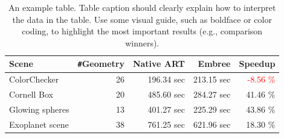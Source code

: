 \begin{table}
	\centering
	{\footnotesize\sf
		\begin{tabular}{lrrrr}
			\toprule
			Scene & \Verb!#!Geometry & Native ART & Embree & Speedup \\ 
			\midrule
			ColorChecker & 26 & 196.34 sec & 213.15 sec & \textcolor{red}{-8.56 \%} \\
			Cornell Box & 20 & 485.60 sec & 284.27 sec & 41.46 \% \\
			Glowing spheres & 13 & 401.27 sec & 225.29 sec & 43.86 \%  \\
			Exoplanet scene & 38 & 761.25 sec & 621.96 sec & 18.30 \% \\
			\bottomrule
	\end{tabular}}
	\caption{An example table. Table caption should clearly explain how to interpret the data in the table. Use some visual guide, such as boldface or color coding, to highlight the most important results (e.g., comparison winners).}
	\label{tab:scenes}
\end{table}


